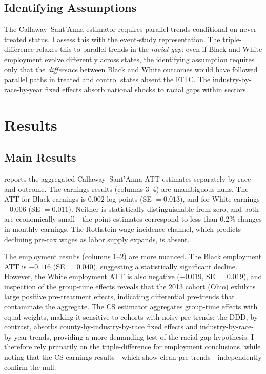 \documentclass[12pt]{article}
\begin{document}
\subsection{Identifying Assumptions}

The Callaway--Sant'Anna estimator requires parallel trends conditional on never-treated status. I assess this with the event-study representation. The triple-difference relaxes this to parallel trends in the \textit{racial gap}: even if Black and White employment evolve differently across states, the identifying assumption requires only that the \textit{difference} between Black and White outcomes would have followed parallel paths in treated and control states absent the EITC. The industry-by-race-by-year fixed effects absorb national shocks to racial gaps within sectors.

\section{Results}

\subsection{Main Results}



 reports the aggregated Callaway--Sant'Anna ATT estimates separately by race and outcome. The earnings results (columns 3--4) are unambiguous nulls. The ATT for Black earnings is $0.002$ log points (SE $= 0.013$), and for White earnings $-0.006$ (SE $= 0.011$). Neither is statistically distinguishable from zero, and both are economically small---the point estimates correspond to less than 0.2\% changes in monthly earnings. The Rothstein wage incidence channel, which predicts declining pre-tax wages as labor supply expands, is absent.

The employment results (columns 1--2) are more nuanced. The Black employment ATT is $-0.116$ (SE $= 0.040$), suggesting a statistically significant decline. However, the White employment ATT is also negative ($-0.019$, SE $= 0.019$), and inspection of the group-time effects reveals that the 2013 cohort (Ohio) exhibits large positive pre-treatment effects, indicating differential pre-trends that contaminate the aggregate. The CS estimator aggregates group-time effects with equal weights, making it sensitive to cohorts with noisy pre-trends; the DDD, by contrast, absorbs county-by-industry-by-race fixed effects and industry-by-race-by-year trends, providing a more demanding test of the racial gap hypothesis. I therefore rely primarily on the triple-difference for employment conclusions, while noting that the CS earnings results---which show clean pre-trends---independently confirm the null.
\end{document}
